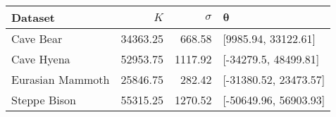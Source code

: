 
\begin{tabular}{lrrl}
\toprule
Dataset & $K$ & $\sigma$ & $\bm{\theta}$\\
\midrule
Cave Bear & 34363.25 & 668.58 & {}[9985.94, 33122.61]\\
Cave Hyena & 52953.75 & 1117.92 & {}[-34279.5, 48499.81]\\
Eurasian Mammoth & 25846.75 & 282.42 & {}[-31380.52, 23473.57]\\
Steppe Bison & 55315.25 & 1270.52 & {}[-50649.96, 56903.93]\\
\bottomrule
\end{tabular}
